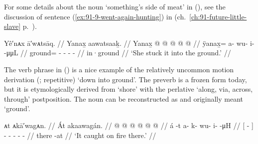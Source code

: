 



For some details about the noun  ‘something’s side of meat’ in (\lastx), see the discussion of sentence (\ref{ex:91-9-went-again-hunting}) in  (ch.\ \ref{ch:91-future-little-slave} p.\ \pageref{ex:91-9-went-again-hunting}).

\ex\label{ex:92-128-stuck-in-ground}%
%
\begingl
	\glpreamble	Yê′nᴀx ā′wᴀtsāq. //
	\glpreamble	Yanax̱ aawatsaaḵ. //
	\gla	Yanax̱ @  @ {} @ {} @ {} @ {} //
	\glb	ÿanax̱= a- wu- i-  -μμL //
	\glc	ground= - - -  - //
	\gld	in·ground  {} {} {} {} //
	\glft	‘She stuck it into the ground.’
		//
\endgl
\xe

The verb phrase in (\lastx) is a nice example of the relatively uncommon motion derivation  (;  repetitive) ‘down into ground’.
The preverb is a frozen form today, but it is etymologically derived from  ‘shore’ with the perlative  ‘along, via, across, through’ postposition.
The noun  can be reconstructed as  and originally meant ‘ground’.

\ex\label{ex:92-129-burned-there}%
%
\begingl
	\glpreamble	ᴀt ᴀkā′wagᴀn. //
	\glpreamble	Át akaawagán. //
	\gla	{}  @ {} {}  @ {} @ {} @ {} @ {} @ {} //
	\glb	{} á -t {} a- k- wu- i-  -μH //
	\glc	{}[  - {}]
		- - - -  - //
	\gld	{} there -at {}  //
	\glft	‘It caught on fire there.’
		//
\endgl
\xe

